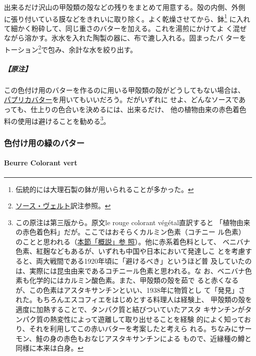 \begin{recette}
出来るだけ沢山の甲殻類の殻などの残りをまとめて用意する。殻の内側、外側
に張り付いている膜などをきれいに取り除く。よく乾燥させてから、鉢\footnote{伝統的には大理石製の鉢が用いられることが多かった。}
に入れて細かく粉砕して、同じ重さのバターを加える。これを湯煎にかけてよ
く混ぜながら溶かす。氷水を入れた陶製の器に、布で漉し入れる。固まったバ
ターをトーション\footnote{\protect\hyperlink{sauce-verte}{ソース・ヴェルト}訳注参照。}で包み、余計な水を絞り出す。

\hypertarget{ux539fux6ce8}{%
\subparagraph{【原注】}\label{ux539fux6ce8}}

この色付け用のバターを作るのに用いる甲殻類の殻がどうしてもない場合は、
\protect\hyperlink{beurre-de-paprika}{パプリカバター}を用いてもいいだろう。だがいずれに
せよ、どんなソースであっても、仕上りの色合いを決めるには、出来るだけ、
他の植物由来の赤色着色料の使用は避けることを勧める\footnote{この原注は第三版から。原文le
  rouge colorant végétal直訳すると
  「植物由来の赤色着色料」だが。ここではおそらくカルミン色素（コチニー
  ル色素）のことと思われる（\protect\hyperlink{observation-sur-les-beurres-composes}{本節「概説」参
  照}）。他に赤系着色料として、
  ベニバナ色素、紅麹などもあるが、いずれも中国や日本において発達しこ
  とを考慮すると、両大戦間である1920年頃に「避けるべき」というほど普
  及していたのは、実際には昆虫由来であるコチニール色素と思われる。な
  お、ベニバナ色素も化学的にはカルミン酸色素。また、甲殻類の殻を茹で
  ると赤くなるが、この色素はアスタキサンチンといい、1938年に物質とし
  て「発見」された。もちろんエスコフィエをはじめとする料理人は経験上、
  甲殻類の殻を適度に加熱することで、タンパク質と結びついていたアスタ
  キサンチンがタンパク質の熱変性によって遊離して取り出せることを経験
  的によく知っており、それを利用してこの赤いバターを考案したと考えら
  れる。ちなみにサーモン、鮭の身の赤色もおなじアスタキサンチンによる
  もので、近縁種の鱒と同様に本来は白身。}。

\maeaki

\hypertarget{ux8272ux4ed8ux3051ux7528ux306eux7dd1ux306eux30d0ux30bfux30fc}{%
\subsubsection{色付け用の緑のバター}\label{ux8272ux4ed8ux3051ux7528ux306eux7dd1ux306eux30d0ux30bfux30fc}}

\hypertarget{beurre-colorant-vert}{%
\paragraph{Beurre Colorant vert}\label{beurre-colorant-vert}}


\end{recette}
